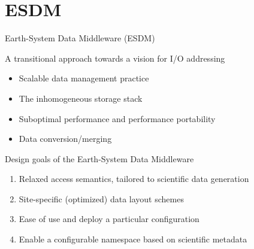 \documentclass[compress,11pt,xcolor=svgnames,aspectratio=169]{beamer}
\begin{document}
\acknowledgement

\appendix

\begin{frame}[fragile]{}

{ \huge \color{EsiBlue}{Appendix}}

\end{frame}

\section{ESDM}

\begin{frame}[fragile]{Earth-System Data Middleware (ESDM)}

\begin{block}{A transitional approach towards a vision for I/O addressing}
\begin{itemize}
\setlength\itemsep{0.1cm}
  \item Scalable data management practice
  \item The inhomogeneous storage stack
  \item Suboptimal performance and performance portability
  \item Data conversion/merging
\end{itemize}
\end{block}

\begin{block}{Design goals of the Earth-System Data Middleware}
\begin{enumerate}
\setlength\itemsep{0.1cm}
  \item Relaxed access semantics, tailored to scientific data generation
  \item Site-specific (optimized) data layout schemes
  \item Ease of use and deploy a particular configuration
  \item Enable a configurable namespace based on scientific metadata
\end{enumerate}
\end{block}

\end{frame}
\end{document}

